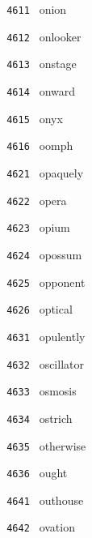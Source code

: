 \documentclass[11pt]{article}
\begin{document}
\begin{multicols}{6}
\noindent \texttt{ 4611 } \hspace{1mm} onion  \par
\noindent \texttt{ 4612 } \hspace{1mm} onlooker  \par
\noindent \texttt{ 4613 } \hspace{1mm} onstage  \par
\noindent \texttt{ 4614 } \hspace{1mm} onward  \par
\noindent \texttt{ 4615 } \hspace{1mm} onyx  \par
\noindent \texttt{ 4616 } \hspace{1mm} oomph  \par
\noindent \texttt{ 4621 } \hspace{1mm} opaquely  \par
\noindent \texttt{ 4622 } \hspace{1mm} opera  \par
\noindent \texttt{ 4623 } \hspace{1mm} opium  \par
\noindent \texttt{ 4624 } \hspace{1mm} opossum  \par
\noindent \texttt{ 4625 } \hspace{1mm} opponent  \par
\noindent \texttt{ 4626 } \hspace{1mm} optical  \par
\noindent \texttt{ 4631 } \hspace{1mm} opulently  \par
\noindent \texttt{ 4632 } \hspace{1mm} oscillator  \par
\noindent \texttt{ 4633 } \hspace{1mm} osmosis  \par
\noindent \texttt{ 4634 } \hspace{1mm} ostrich  \par
\noindent \texttt{ 4635 } \hspace{1mm} otherwise  \par
\noindent \texttt{ 4636 } \hspace{1mm} ought  \par
\noindent \texttt{ 4641 } \hspace{1mm} outhouse  \par
\noindent \texttt{ 4642 } \hspace{1mm} ovation  \par

\end{multicols}
\end{document}
